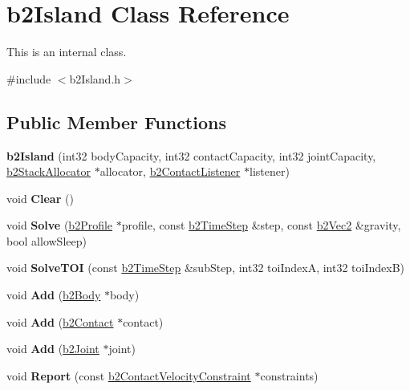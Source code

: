 \hypertarget{classb2Island}{}\section{b2\+Island Class Reference}
\label{classb2Island}


This is an internal class.  




{\ttfamily \#include $<$b2\+Island.\+h$>$}

\subsection*{Public Member Functions}
\begin{DoxyCompactItemize}
\item 
\mbox{\label{classb2Island_a2f2258f09d2663dcb35a1d69d16896cb}} 
{\bfseries b2\+Island} (int32 body\+Capacity, int32 contact\+Capacity, int32 joint\+Capacity, \mbox{\hyperlink{classb2StackAllocator}{b2\+Stack\+Allocator}} $\ast$allocator, \mbox{\hyperlink{classb2ContactListener}{b2\+Contact\+Listener}} $\ast$listener)
\item 
\mbox{\label{classb2Island_a26566f7388fcaf7523446e5e76d99c4d}} 
void {\bfseries Clear} ()
\item 
\mbox{\label{classb2Island_a28a6f74174cde3a6e93663c740f418fa}} 
void {\bfseries Solve} (\mbox{\hyperlink{structb2Profile}{b2\+Profile}} $\ast$profile, const \mbox{\hyperlink{structb2TimeStep}{b2\+Time\+Step}} \&step, const \mbox{\hyperlink{structb2Vec2}{b2\+Vec2}} \&gravity, bool allow\+Sleep)
\item 
\mbox{\label{classb2Island_a61f577b473962bb0d8add1f55eeef7ee}} 
void {\bfseries Solve\+T\+OI} (const \mbox{\hyperlink{structb2TimeStep}{b2\+Time\+Step}} \&sub\+Step, int32 toi\+IndexA, int32 toi\+IndexB)
\item 
\mbox{\label{classb2Island_af2d54861bd063051c0a6dc5f73b27c3e}} 
void {\bfseries Add} (\mbox{\hyperlink{classb2Body}{b2\+Body}} $\ast$body)
\item 
\mbox{\label{classb2Island_abc0ea9208e818b551404fd507f197a51}} 
void {\bfseries Add} (\mbox{\hyperlink{classb2Contact}{b2\+Contact}} $\ast$contact)
\item 
\mbox{\label{classb2Island_a04e6ccd0c11f6ef5a7ed0a926d081445}} 
void {\bfseries Add} (\mbox{\hyperlink{classb2Joint}{b2\+Joint}} $\ast$joint)
\item 
\mbox{\label{classb2Island_a57620f76faf000f61c76e925e40e6129}} 
void {\bfseries Report} (const \mbox{\hyperlink{structb2ContactVelocityConstraint}{b2\+Contact\+Velocity\+Constraint}} $\ast$constraints)
\end{DoxyCompactItemize}
